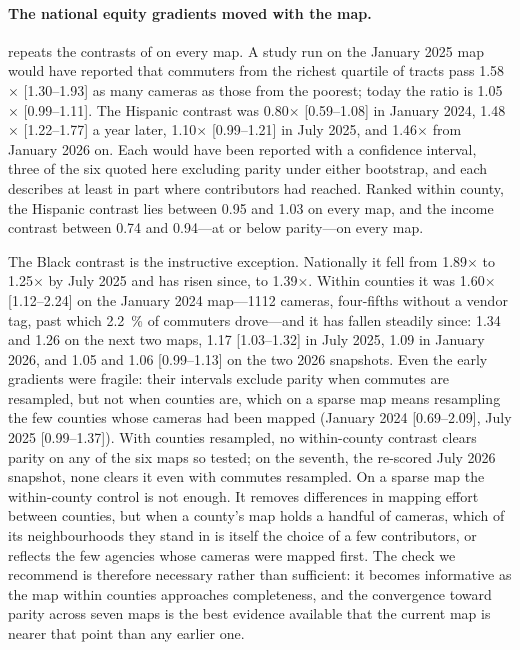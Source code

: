 \documentclass[11pt,twoside]{article}
\begin{document}
\paragraph{The national equity gradients moved with the map.} 
repeats the contrasts of  on every map. A study
run on the January 2025 map would have reported that commuters from the richest quartile of
tracts pass \num{1.58}$\times$ [1.30--1.93] as many cameras as those from the poorest; today
the ratio is \num{1.05}$\times$ [0.99--1.11]. The Hispanic contrast was \num{0.80}$\times$
[0.59--1.08] in January 2024, \num{1.48}$\times$ [1.22--1.77] a year later,
\num{1.10}$\times$ [0.99--1.21] in July 2025, and \num{1.46}$\times$ from January 2026 on.
Each would have been reported with a confidence interval, three of the six quoted here
excluding parity under either bootstrap, and each describes at least in part where contributors
had reached. Ranked
within county, the Hispanic contrast lies between \num{0.95} and \num{1.03} on every map, and
the income contrast between \num{0.74} and \num{0.94}---at or below parity---on every map.

The Black contrast is the instructive exception. Nationally it fell from \num{1.89}$\times$
to \num{1.25}$\times$ by July 2025 and has risen since, to \num{1.39}$\times$. Within
counties it was \num{1.60}$\times$ [1.12--2.24] on the January 2024 map---\num{1112}
cameras, four-fifths without a vendor tag, past which \SI{2.2}{\percent} of commuters
drove---and it has fallen steadily since: \num{1.34} and \num{1.26} on the next two maps,
\num{1.17} [1.03--1.32] in July 2025, \num{1.09} in January 2026, and \num{1.05} and
\num{1.06} [0.99--1.13] on the two 2026 snapshots. Even the early gradients were fragile:
their intervals exclude parity when commutes are resampled, but not when counties are, which on
a sparse map means resampling the few counties whose cameras had been mapped (January 2024
[0.69--2.09], July 2025 [0.99--1.37]). With counties resampled, no within-county contrast clears
parity on any of the six maps so tested; on the seventh, the re-scored July 2026 snapshot, none
clears it even with commutes resampled. On a sparse map the within-county control is not enough. It removes differences in mapping effort between
counties, but when a county's map holds a handful of cameras, which of its neighbourhoods
they stand in is itself the choice of a few contributors, or reflects the few agencies whose
cameras were mapped first. The check we recommend is therefore necessary rather than
sufficient: it becomes informative as the map within counties approaches completeness, and
the convergence toward parity across seven maps is the best evidence available that the
current map is nearer that point than any earlier one.
\end{document}
